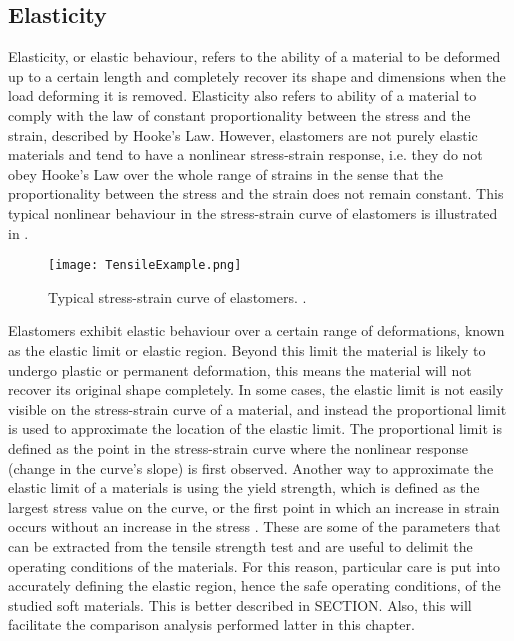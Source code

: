 \subsection{Elasticity}

Elasticity, or elastic behaviour, refers to the ability of a material to be deformed up to a certain length and completely recover its shape and dimensions when the load deforming it is removed. Elasticity also refers to ability of a material to comply with the law of constant proportionality between the stress and the strain, described by Hooke's Law. However, elastomers are not purely elastic materials and tend to have a nonlinear stress-strain response, i.e. they do not obey Hooke's Law over the whole range of strains in the sense that the proportionality between the stress and the strain does not remain constant. This typical nonlinear behaviour in the stress-strain curve of elastomers is illustrated in .

\begin{figure}[hbt!]
    \centering
    \texttt{[image: TensileExample.png]}
    \caption{Typical stress-strain curve of elastomers. \cite{Bauman2008}.}
    \label{fig:tensile}
\end{figure}

Elastomers exhibit elastic behaviour over a certain range of deformations, known as the elastic limit or elastic region. Beyond this limit the material is likely to undergo plastic or permanent deformation, this means the material will not recover its original shape completely. In some cases, the elastic limit is not easily visible on the stress-strain curve of a material, and instead the proportional limit is used to approximate the location of the elastic limit. The proportional limit is defined as the point in the stress-strain curve where the nonlinear response (change in the curve's slope) is first observed. Another way to approximate the elastic limit of a materials is using the yield strength, which is defined as the largest stress value on the curve, or the first point in which an increase in strain occurs without an increase in the stress \cite{ebewele2000}. These are some of the parameters that can be extracted from the tensile strength test and are useful to delimit the operating conditions of the materials. For this reason, particular care is put into accurately defining the elastic region, hence the safe operating conditions, of the studied soft materials. This is better described in SECTION. Also, this will facilitate the comparison analysis performed latter in this chapter.

